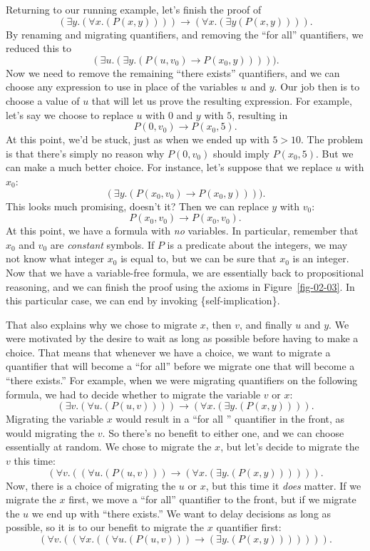 {{Returning to our running example, let's finish the proof of 
$$(\exists y.(\forall x.(P(x, y)))) \rightarrow (\forall x.(\exists y (P(x, y)))).$$
By renaming and migrating quantifiers, and removing the ``for all'' quantifiers, we reduced
this to
$$(\exists u.(\exists y.(P(u, v_0) \rightarrow P(x_0, y))))).$$
Now we need to remove the remaining ``there exists'' quantifiers, and we can choose any
expression to use in place of the variables $u$ and $y$. Our job then is to choose a value
of $u$ that will let us prove the resulting expression. For example, let's say we choose
to replace $u$ with $0$ and $y$ with $5$, resulting in
$$P(0, v_0) \rightarrow P(x_0, 5).$$
At this point, we'd be stuck, just as when we ended up with $5 > 10$. The problem is that
there's simply no reason why $P(0, v_0)$ should imply $P(x_0, 5)$. But we can make a much
better choice. For instance, let's suppose that we replace $u$ with $x_0$:
$$(\exists y.(P(x_0, v_0) \rightarrow P(x_0, y)))).$$
This looks much promising, doesn't it? Then we can replace $y$ with $v_0$:
$$P(x_0, v_0) \rightarrow P(x_0, v_0).$$
At this point, we have a formula with \emph{no} variables. In particular, remember that
$x_0$ and $v_0$ are \emph{constant} symbols. If $P$ is a predicate about the integers, we 
may not know what integer $x_0$ is equal to, but we can be sure that $x_0$ is an integer.
Now that we have a variable-free formula, we are essentially back to propositional reasoning,
and we can finish the proof using the axioms in Figure~\ref{fig-02-03}. In this particular
case, we can end by invoking \{self-implication\}.

That also explains why we chose to migrate $x$, then $v$, and finally $u$ and $y$.
We were motivated by the desire to wait as long as possible before having to make
a choice. That means that whenever we have a choice, we want to migrate a quantifier
that will become a ``for all'' before we migrate one that will become a ``there exists.'' 
For example, when we were migrating quantifiers on the following formula, we had to 
decide whether to migrate the variable $v$ or $x$:
$$(\exists v.(\forall u.(P(u, v)))) \rightarrow (\forall x.(\exists y.(P(x, y)))).$$
Migrating the variable $x$ would result in a ``for all '' quantifier in the front,
as would migrating the $v$. So there's no benefit to either one, and we can choose
essentially at random. We chose to migrate the $x$, but let's decide to migrate
the $v$ this time:
$$(\forall v.((\forall u.(P(u, v))) \rightarrow (\forall x.(\exists y.(P(x, y)))))).$$
Now, there is a choice of migrating the $u$ or $x$, but this time it \emph{does}
matter. If we migrate the $x$ first, we move a ``for all'' quantifier to the front,
but if we migrate the $u$ we end up with ``there exists.'' We want to delay decisions
as long as possible, so it is to our benefit to migrate the $x$ quantifier first:
$$(\forall v.((\forall x.((\forall u.(P(u, v))) \rightarrow (\exists y.(P(x, y))))))).$$

}}
